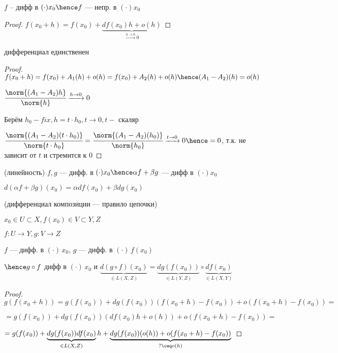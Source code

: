 \begin{properties}{}
    \item $f$ -- дифф в $(\cdot) x_0 \hence f $ --- непр. в $(\cdot) x_0$
    \begin{proof}
        $f(x_0 + h) = f(x_0) + \underbrace{df(x_0)h + o(h)}_{\xrightarrow{h \to 0}0}$
    \end{proof} 
    \item дифференциал единственен
    \begin{proof}
        $f(x_0 + h) = f(x_0) + A_1(h) + o(h) = f(x_0) + A_2(h) + o(h) \hence (A_1 - A_2)(h) = o(h)$

        $\cfrac{\norm{(A_1 - A_2)h}}{\norm{h}} \xrightarrow{h \to 0} 0$
    
        Берём $h_0 - fix, h = t \cdot h_0, t \to 0, t - $ скаляр

        $\cfrac{\norm{(A_1 - A_2)(t \cdot h_0)}}{\norm{t \cdot h_0}}  
        = \cfrac{\norm{(A_1 - A_2)(h_0)}}{\norm{h_0}} \xrightarrow{t \to 0} 0 \hence 
        = 0$, т.к. не зависит от $t$ и стремится к $0$ 
    \end{proof}

    \item (линейность) $f, g$ --- дифф. в $(\cdot) x_0 \hence \alpha f + \beta g $ --- дифф  в $(\cdot) x_0 $
    
    $d(\alpha f + \beta g)(x_0) = \alpha df(x_0) + \beta dg(x_0)$

    \item (дифференциал композиции --- правило цепочки)
    
    $x_0 \in U \subset X, f(x_0) \in V \subset Y, Z$

    $f : U \to Y, g : V \to Z$

    $f$ --- дифф. в $(\cdot)\, x_0$, 
    $g$ --- дифф. в $(\cdot)\, f(x_0)$

    $\hence g \circ f $ дифф в $(\cdot)\, x_0$ и $\underbrace{d(g \circ f) (x_0)}_{\in L(X, Z)}  = \underbrace{dg(f(x_0))}_{\in L(Y, Z)} \circ \underbrace{df(x_0)}_{\in L(X, Y)}$
\newpage
    \begin{proof}
        $g(f(x_0 + h)) = g(f(x_0)) + dg(f(x_0))(f(x_0 + h) - f(x_0)) + o(f(x_0 + h) - f(x_0)) = $ 
        
        $= g(f(x_0)) + dg(f(x_0))(df(x_0)h + o(h)) + o(f(x_0 + h) - f(x_0)) = $


        $= g(f(x_0)) + \underbrace{dg(f(x_0)) df(x_0)}_{\in L(X, Z)} h + \underbrace{dg(f(x_0))(o(h)) + o(f(x_0 + h) - f(x_0))}_{?\ceq o(h)}$


\end{proof}
\end{properties}

